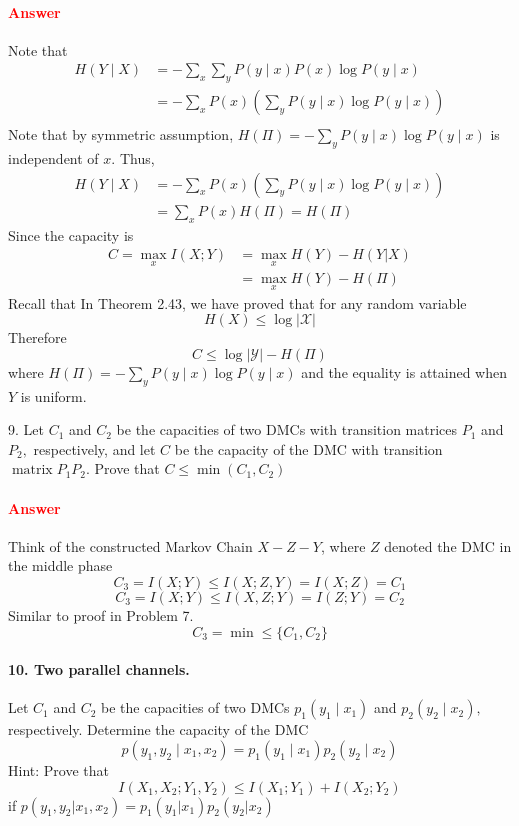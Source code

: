 \documentclass[8pt]{article}
\begin{document}
\paragraph{\textcolor{red}{Answer}}
Note that 
$$
\begin{aligned}
H(Y \mid X) &= -\sum_{x} \sum_{y} P(y \mid x)P(x) \log P(y \mid x)  \\
&=-\sum_{x} P(x) \left(\sum_{y} P(y \mid x) \log P(y \mid x) \right)\\
\end{aligned}
$$
Note that by symmetric assumption,
$H(\Pi)=-\sum_{y} P(y \mid x) \log P(y \mid x)$ is independent of $x$. Thus,
$$
\begin{aligned}
H(Y \mid X) &= -\sum_{x} P(x) \left(\sum_{y} P(y \mid x) \log P(y \mid x) \right)\\
& = \sum_{x} P(x) H(\Pi) = H(\Pi)
\end{aligned}
$$
Since the capacity is
$$
\begin{aligned}
C=\max _{x} I(X;Y)  
&= \max _{x}  H(Y) - H(Y|X) \\ 
&= \max _{x}  H(Y) - H(\Pi)
\end{aligned}
$$
Recall that In Theorem 2.43, we have proved that for any random variable 
$$
H(X) \leq \log |\mathcal{X}|
$$
Therefore
$$
C \leq \log |\mathcal{Y }| - H(\Pi)
$$
where $H(\Pi)=-\sum_{y} P(y \mid x) \log P(y \mid x)$ and the equality is attained when $Y$ is uniform.
\begin{tcolorbox}
9. Let $C_{1}$ and $C_{2}$ be the capacities of two DMCs with transition matrices $P_{1}$ and $P_{2},$ respectively, and let $C$ be the capacity of the DMC with transition $\operatorname{matrix} P_{1} P_{2} .$ Prove that $C \leq \min \left(C_{1}, C_{2}\right)$
\end{tcolorbox}
\paragraph{\textcolor{red}{Answer}}
Think of the constructed Markov Chain $X-Z-Y$, where $Z$ denoted the DMC in the middle phase
$$
C_{3}=I(X ; Y) \leq I(X ; Z, Y)=I(X ; Z)=C_{1}
$$
$$
C_{3}=I(X ; Y) \leq I(X, Z ; Y)=I(Z ; Y)=C_{2}
$$
Similar to proof in Problem 7.
$$
C_{3}=\min \leq \{C_{1}, C_{2} \}
$$
\begin{tcolorbox}
\paragraph{10. Two parallel channels.} Let $C_{1}$ and $C_{2}$ be the capacities of two DMCs $p_{1}\left(y_{1} \mid x_{1}\right)$ and $p_{2}\left(y_{2} \mid x_{2}\right),$ respectively. Determine the capacity of the DMC
$$
p\left(y_{1}, y_{2} \mid x_{1}, x_{2}\right)=p_{1}\left(y_{1} \mid x_{1}\right) p_{2}\left(y_{2} \mid x_{2}\right)
$$
Hint: Prove that
$$
I\left(X_{1}, X_{2} ; Y_{1}, Y_{2}\right) \leq I\left(X_{1} ; Y_{1}\right)+I\left(X_{2} ; Y_{2}\right)
$$
if $p\left(y_{1}, y_{2} | x_{1}, x_{2}\right)=p_{1}\left(y_{1} | x_{1}\right) p_{2}\left(y_{2} | x_{2}\right) $
\end{tcolorbox}
\end{document}
